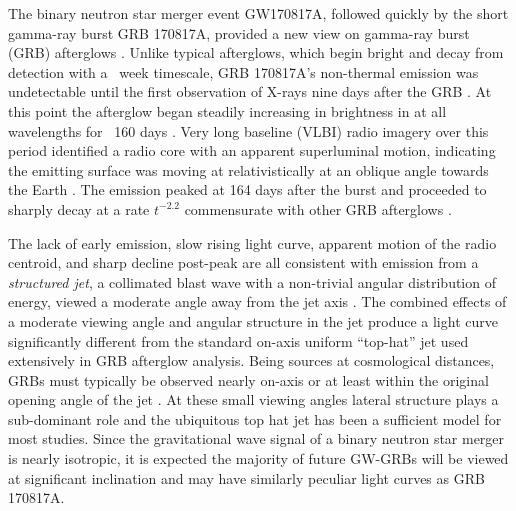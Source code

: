 \documentclass[twocolumn]{aastex62}
\newcommand{\gwbns}{GW170817A}
\newcommand{\grbbns}{GRB 170817A}
\begin{document}
The binary neutron star merger event \gwbns{}, followed quickly by the short gamma-ray burst \grbbns{}, provided a new view on gamma-ray burst (GRB) afterglows \citep{Abbott:2017ab, Abbott:2017ac}.  Unlike typical afterglows, which begin bright and decay from detection with a ~week timescale, \grbbns{}'s non-thermal emission was undetectable until the first observation of X-rays nine days after the GRB \citep{Troja:2017aa}.  At this point the afterglow began steadily increasing in brightness in at all wavelengths for ~160 days \citep{Haggard:2017aa, Hallinan:2017aa, DAvanzo:2018aa,  Lyman:2018aa, Margutti:2018aa, Mooley:2018aa, Troja:2018aa, Troja:2019ab}.  Very long baseline (VLBI) radio imagery over this period identified a radio core with an apparent superluminal motion, indicating the emitting surface was moving at relativistically at an oblique angle towards the Earth \citep{Mooley:2018ab}. The emission peaked at 164 days after the burst and proceeded to sharply decay at a rate $t^{-2.2}$ commensurate with other GRB afterglows \citep{Alexander:2018aa, Fong:2019aa, Lamb:2019aa, Troja:2019ab}.

The lack of early emission, slow rising light curve, apparent motion of the radio centroid, and sharp decline post-peak are all consistent with emission from a \emph{structured jet}, a collimated blast wave with a non-trivial angular distribution of energy, viewed a moderate angle away from the jet axis \citep{Lamb:2017aa, Alexander:2018aa, Hotokezaka:2018aa, Wu:2018aa, Xie:2018aa,  Ghirlanda:2019aa, Fong:2019aa, Lamb:2019aa, Troja:2019aa}.  The combined effects of a moderate viewing angle and angular structure in the jet produce a light curve significantly different from the standard on-axis uniform ``top-hat'' jet used extensively in GRB afterglow analysis. Being sources at cosmological distances, GRBs must typically be observed nearly on-axis or at least within the original opening angle of the jet \citep{Ryan:2015aa}. At these small viewing angles lateral structure plays a sub-dominant role and the ubiquitous top hat jet has been a sufficient model for most studies.  Since the gravitational wave signal of a binary neutron star merger is nearly isotropic, it is expected the majority of future GW-GRBs will be viewed at significant inclination and may have similarly peculiar light curves as \grbbns{}.
\end{document}
